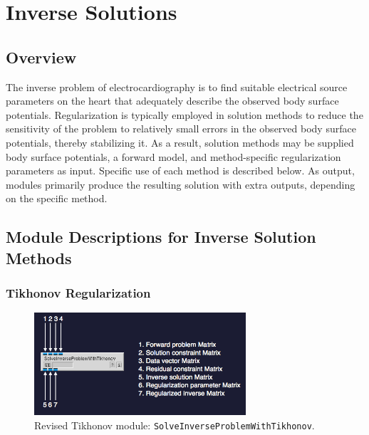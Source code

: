 \chapter{Inverse Solutions}
\label{ch:inv}

\section{Overview}

The inverse problem of electrocardiography is to find suitable electrical source parameters on the heart that adequately describe the observed body surface potentials. Regularization is typically employed in solution methods to reduce the sensitivity of the problem to relatively small errors in the observed body surface potentials, thereby stabilizing it. As a result, solution methods may be supplied body surface potentials, a forward model, and method-specific regularization parameters as input. Specific use of each method is described below. As output, modules primarily produce the resulting solution with extra outputs, depending on the specific method.

\section{Module Descriptions for Inverse Solution Methods}

\subsection{Tikhonov Regularization}

\begin{figure}[H]
\begin{center}
\includegraphics[width=0.7\textwidth]{ECGToolkitGuide_figures/tik1.png}
\caption{Revised Tikhonov module: {\tt SolveInverseProblemWithTikhonov}.  }
\label{tik_module}
\end{center}
\end{figure}

